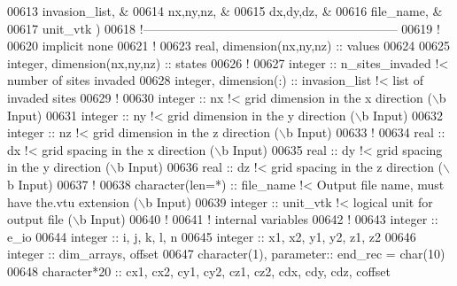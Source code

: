\begin{DoxyCode}
00613                                              invasion\_list,   &
00614                                              nx,ny,nz,        &
00615                                              dx,dy,dz,        &
00616                                              file\_name,       &
00617                                              unit\_vtk         )
00618 \textcolor{comment}{!--------------------------------------------------------------}
00619 \textcolor{comment}{!}
00620 \textcolor{keyword}{implicit none}
00621 \textcolor{comment}{!}
00623 \textcolor{keywordtype}{real}, \textcolor{keywordtype}{dimension(nx,ny,nz)} :: values 
00624 
00625 \textcolor{keywordtype}{integer}, \textcolor{keywordtype}{dimension(nx,ny,nz)} :: states
00626 \textcolor{comment}{!}
00627 \textcolor{keywordtype}{integer} :: n\_sites\_invaded \textcolor{comment}{!< number of sites invaded}
00628 \textcolor{keywordtype}{integer}, \textcolor{keywordtype}{dimension(:)} :: invasion\_list \textcolor{comment}{!< list of invaded sites}
00629 \textcolor{comment}{!}
00630 \textcolor{keywordtype}{integer} :: nx \textcolor{comment}{!< grid dimension in the x direction (\(\backslash\)b Input)}
00631 \textcolor{keywordtype}{integer} :: ny \textcolor{comment}{!< grid dimension in the y direction (\(\backslash\)b Input)}
00632 \textcolor{keywordtype}{integer} :: nz \textcolor{comment}{!< grid dimension in the z direction (\(\backslash\)b Input)}
00633 \textcolor{comment}{!}
00634 \textcolor{keywordtype}{real} :: dx \textcolor{comment}{!< grid spacing in the x direction (\(\backslash\)b Input)}
00635 \textcolor{keywordtype}{real} :: dy \textcolor{comment}{!< grid spacing in the y direction (\(\backslash\)b Input)}
00636 \textcolor{keywordtype}{real} :: dz \textcolor{comment}{!< grid spacing in the z direction (\(\backslash\)b Input)}
00637 \textcolor{comment}{!}
00638 \textcolor{keywordtype}{character(len=*)} :: file\_name \textcolor{comment}{!< Output file name, must have the.vtu extension
       (\(\backslash\)b Input)}
00639 \textcolor{keywordtype}{integer} :: unit\_vtk \textcolor{comment}{!< logical unit for output file (\(\backslash\)b Input)}
00640 \textcolor{comment}{!}
00641 \textcolor{comment}{! internal variables}
00642 \textcolor{comment}{!}
00643 \textcolor{keywordtype}{integer} :: e\_io
00644 \textcolor{keywordtype}{integer} :: i, j, k, l, n
00645 \textcolor{keywordtype}{integer} :: x1, x2, y1, y2, z1, z2
00646 \textcolor{keywordtype}{integer} :: dim\_arrays, offset
00647 \textcolor{keywordtype}{character(1)}, \textcolor{keywordtype}{parameter}:: end\_rec = char(10)
00648 \textcolor{keywordtype}{character*20} :: cx1, cx2, cy1, cy2, cz1, cz2, cdx, cdy, cdz, coffset

\end{DoxyCode}
